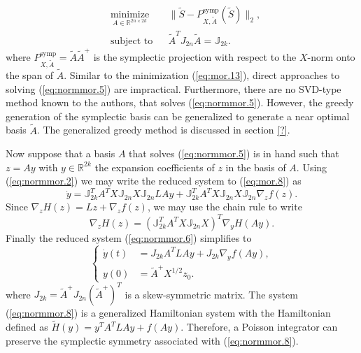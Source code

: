 \begin{equation} \label{eq:normmor.5}
\begin{aligned}
& \underset{A\in \mathbb{R}^{2n\times 2k}}{\text{minimize}}
& & \| \tilde S - P^\text{symp}_{X,\tilde A}(\tilde S) \|_2, \\
& \text{subject to}
& & \tilde A^T J_{2n} \tilde A = \mathbb J_{2k}.
\end{aligned}
\end{equation}
where $P^\text{symp}_{X,\tilde A} = \tilde A \tilde A^+$ is the symplectic projection with respect to the $X$-norm onto the span of $\tilde A$. Similar to the minimization (\ref{eq:mor.13}), direct approaches to solving (\ref{eq:normmor.5}) are impractical. Furthermore, there are no SVD-type method known to the authors, that solves (\ref{eq:normmor.5}). However, the greedy generation of the symplectic basis can be generalized to generate a near optimal basis $\tilde A$. The generalized greedy method is discussed in section \ref{?}.

Now suppose that a basis $A$ that solves (\ref{eq:normmor.5}) is in hand such that $z = Ay$ with $y\in \mathbb R^{2k}$ the expansion coefficients of $z$ in the basis of $A$. Using (\ref{eq:normmor.2}) we may write the reduced system to (\ref{eq:mor.8}) as
\begin{equation} \label{eq:normmor.6}
	\dot y = \mathbb J_{2k}^T A^T X \mathbb J_{2n} X \mathbb{J}_{2n} LAy + \mathbb J_{2k}^T A^T X \mathbb J_{2n} X \mathbb{J}_{2n} \nabla_z f(z).
\end{equation}
Since $\nabla_z H(z) = Lz + \nabla_z f(z)$, we may use the chain rule to write
\begin{equation} \label{eq:normmor.7}
	\nabla_z H(z) = ( \mathbb J_{2k}^T A^T X \mathbb J_{2n} X )^T \nabla_y H(Ay).
\end{equation}
Finally the reduced system (\ref{eq:normmor.6}) simplifies to
\begin{equation} \label{eq:normmor.8}
\left\{
\begin{aligned}
	\dot y(t) &= J_{2k} A^T L A y + J_{2k} \nabla_y f(Ay), \\
	y(0) &= \tilde A^+ X^{1/2} z_0.
\end{aligned}
\right.
\end{equation}
where $J_{2k}=\tilde A^+ J_{2n} (\tilde A^+)^T$ is a skew-symmetric matrix. The system (\ref{eq:normmor.8}) is a generalized Hamiltonian system with the Hamiltonian defined as $\tilde H(y) = y^TA^TLAy + f(Ay)$. Therefore, a Poisson integrator can preserve the symplectic symmetry associated with (\ref{eq:normmor.8}). 


